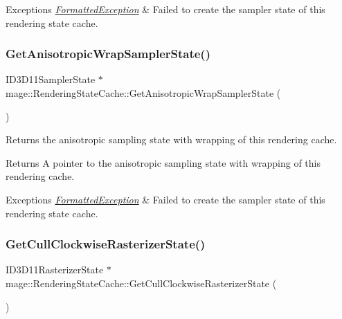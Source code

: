\begin{DoxyExceptions}{Exceptions}
{\em \hyperlink{structmage_1_1_formatted_exception}{Formatted\+Exception}} & Failed to create the sampler state of this rendering state cache. \\
\hline
\end{DoxyExceptions}
\hypertarget{structmage_1_1_rendering_state_cache_a183a1b919105bd1758cc6fb6cdeab018}{}\label{structmage_1_1_rendering_state_cache_a183a1b919105bd1758cc6fb6cdeab018} 
\subsubsection{\texorpdfstring{Get\+Anisotropic\+Wrap\+Sampler\+State()}{GetAnisotropicWrapSamplerState()}}
{\footnotesize\ttfamily I\+D3\+D11\+Sampler\+State $\ast$ mage\+::\+Rendering\+State\+Cache\+::\+Get\+Anisotropic\+Wrap\+Sampler\+State (\begin{DoxyParamCaption}{ }\end{DoxyParamCaption})}

Returns the anisotropic sampling state with wrapping of this rendering cache.

\begin{DoxyReturn}{Returns}
A pointer to the anisotropic sampling state with wrapping of this rendering cache. 
\end{DoxyReturn}

\begin{DoxyExceptions}{Exceptions}
{\em \hyperlink{structmage_1_1_formatted_exception}{Formatted\+Exception}} & Failed to create the sampler state of this rendering state cache. \\
\hline
\end{DoxyExceptions}
\hypertarget{structmage_1_1_rendering_state_cache_a4055aaf84813811b94ed741c07cbee3c}{}\label{structmage_1_1_rendering_state_cache_a4055aaf84813811b94ed741c07cbee3c} 
\subsubsection{\texorpdfstring{Get\+Cull\+Clockwise\+Rasterizer\+State()}{GetCullClockwiseRasterizerState()}}
{\footnotesize\ttfamily I\+D3\+D11\+Rasterizer\+State $\ast$ mage\+::\+Rendering\+State\+Cache\+::\+Get\+Cull\+Clockwise\+Rasterizer\+State (\begin{DoxyParamCaption}{ }\end{DoxyParamCaption})}

